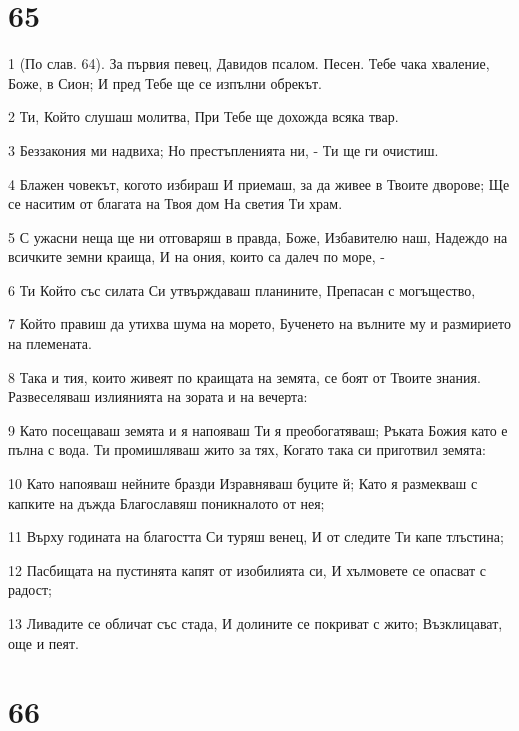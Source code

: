 \chapter{65}

\par 1 (По слав. 64). За първия певец, Давидов псалом. Песен. Тебе чака хваление, Боже, в Сион; И пред Тебе ще се изпълни обрекът.
\par 2 Ти, Който слушаш молитва, При Тебе ще дохожда всяка твар.
\par 3 Беззакония ми надвиха; Но престъпленията ни, - Ти ще ги очистиш.
\par 4 Блажен човекът, когото избираш И приемаш, за да живее в Твоите дворове; Ще се наситим от благата на Твоя дом На светия Ти храм.
\par 5 С ужасни неща ще ни отговаряш в правда, Боже, Избавителю наш, Надеждо на всичките земни краища, И на ония, които са далеч по море, -
\par 6 Ти Който със силата Си утвърждаваш планините, Препасан с могъщество,
\par 7 Който правиш да утихва шума на морето, Бученето на вълните му и размирието на племената.
\par 8 Така и тия, които живеят по краищата на земята, се боят от Твоите знания. Развеселяваш излиянията на зората и на вечерта:
\par 9 Като посещаваш земята и я напояваш Ти я преобогатяваш; Ръката Божия като е пълна с вода. Ти промишляваш жито за тях, Когато така си приготвил земята:
\par 10 Като напояваш нейните бразди Изравняваш буците й; Като я размекваш с капките на дъжда Благославяш поникналото от нея;
\par 11 Върху годината на благостта Си туряш венец, И от следите Ти капе тлъстина;
\par 12 Пасбищата на пустинята капят от изобилията си, И хълмовете се опасват с радост;
\par 13 Ливадите се обличат със стада, И долините се покриват с жито; Възклицават, още и пеят.

\chapter{66}

